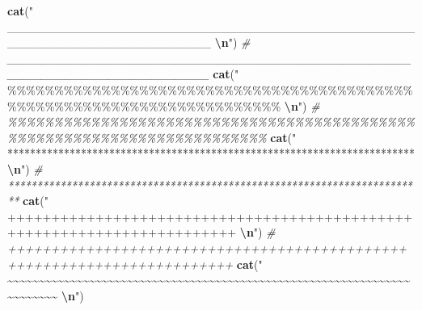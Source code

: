 \documentclass[
]{article}
\newenvironment{Shaded}{\begin{snugshade}}{\end{snugshade}}
\newcommand{\CommentTok}[1]{\textcolor[rgb]{0.56,0.35,0.01}{\textit{#1}}}
\newcommand{\FunctionTok}[1]{\textcolor[rgb]{0.13,0.29,0.53}{\textbf{#1}}}
\newcommand{\NormalTok}[1]{#1}
\newcommand{\SpecialCharTok}[1]{\textcolor[rgb]{0.81,0.36,0.00}{\textbf{#1}}}
\newcommand{\StringTok}[1]{\textcolor[rgb]{0.31,0.60,0.02}{#1}}
\begin{document}
\begin{Shaded}
\begin{Highlighting}[]
\FunctionTok{cat}\NormalTok{(}\StringTok{"    \_\_\_\_\_\_\_\_\_\_\_\_\_\_\_\_\_\_\_\_\_\_\_\_\_\_\_\_\_\_\_\_\_\_\_\_\_\_\_\_\_\_\_\_\_\_\_\_\_\_\_\_\_\_\_\_\_\_\_\_\_\_\_\_\_\_\_\_\_\_\_\_    }\SpecialCharTok{\textbackslash{}n}\StringTok{"}\NormalTok{)}
\CommentTok{\#     \_\_\_\_\_\_\_\_\_\_\_\_\_\_\_\_\_\_\_\_\_\_\_\_\_\_\_\_\_\_\_\_\_\_\_\_\_\_\_\_\_\_\_\_\_\_\_\_\_\_\_\_\_\_\_\_\_\_\_\_\_\_\_\_\_\_\_\_\_\_\_\_}
\FunctionTok{cat}\NormalTok{(}\StringTok{"    \%\%\%\%\%\%\%\%\%\%\%\%\%\%\%\%\%\%\%\%\%\%\%\%\%\%\%\%\%\%\%\%\%\%\%\%\%\%\%\%\%\%\%\%\%\%\%\%\%\%\%\%\%\%\%\%\%\%\%\%\%\%\%\%\%\%\%\%\%\%\%\%    }\SpecialCharTok{\textbackslash{}n}\StringTok{"}\NormalTok{)}
\CommentTok{\#     \%\%\%\%\%\%\%\%\%\%\%\%\%\%\%\%\%\%\%\%\%\%\%\%\%\%\%\%\%\%\%\%\%\%\%\%\%\%\%\%\%\%\%\%\%\%\%\%\%\%\%\%\%\%\%\%\%\%\%\%\%\%\%\%\%\%\%\%\%\%\%\%}
\FunctionTok{cat}\NormalTok{(}\StringTok{"    ************************************************************************    }\SpecialCharTok{\textbackslash{}n}\StringTok{"}\NormalTok{)}
\CommentTok{\#     ************************************************************************}
\FunctionTok{cat}\NormalTok{(}\StringTok{"    ++++++++++++++++++++++++++++++++++++++++++++++++++++++++++++++++++++++++    }\SpecialCharTok{\textbackslash{}n}\StringTok{"}\NormalTok{)}
\CommentTok{\#     ++++++++++++++++++++++++++++++++++++++++++++++++++++++++++++++++++++++++}
\FunctionTok{cat}\NormalTok{(}\StringTok{"    \textasciitilde{}\textasciitilde{}\textasciitilde{}\textasciitilde{}\textasciitilde{}\textasciitilde{}\textasciitilde{}\textasciitilde{}\textasciitilde{}\textasciitilde{}\textasciitilde{}\textasciitilde{}\textasciitilde{}\textasciitilde{}\textasciitilde{}\textasciitilde{}\textasciitilde{}\textasciitilde{}\textasciitilde{}\textasciitilde{}\textasciitilde{}\textasciitilde{}\textasciitilde{}\textasciitilde{}\textasciitilde{}\textasciitilde{}\textasciitilde{}\textasciitilde{}\textasciitilde{}\textasciitilde{}\textasciitilde{}\textasciitilde{}\textasciitilde{}\textasciitilde{}\textasciitilde{}\textasciitilde{}\textasciitilde{}\textasciitilde{}\textasciitilde{}\textasciitilde{}\textasciitilde{}\textasciitilde{}\textasciitilde{}\textasciitilde{}\textasciitilde{}\textasciitilde{}\textasciitilde{}\textasciitilde{}\textasciitilde{}\textasciitilde{}\textasciitilde{}\textasciitilde{}\textasciitilde{}\textasciitilde{}\textasciitilde{}\textasciitilde{}\textasciitilde{}\textasciitilde{}\textasciitilde{}\textasciitilde{}\textasciitilde{}\textasciitilde{}\textasciitilde{}\textasciitilde{}\textasciitilde{}\textasciitilde{}\textasciitilde{}\textasciitilde{}\textasciitilde{}\textasciitilde{}\textasciitilde{}\textasciitilde{}    }\SpecialCharTok{\textbackslash{}n}\StringTok{"}\NormalTok{)}

\end{Highlighting}
\end{Shaded}
\end{document}
